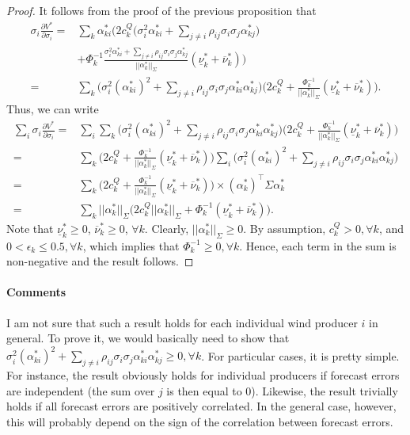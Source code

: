 \documentclass{article}
\begin{document}
\begin{proof}
It follows from the proof of the previous proposition that
\begin{align*}
\sigma_i \frac{\partial V^*}{\partial \sigma_i} =& \sum_k\alpha_{ki}^*\Big(2c_k^Q\big(\sigma_i^2 \alpha_{ki}^* + \sum_{j \ne i} \rho_{ij} \sigma_i \sigma_j\alpha_{kj}^*\big)\\
&+ \Phi_k^{-1} \frac{\sigma_i^2 \alpha_{ki}^* + \sum_{j \ne i} \rho_{ij} \sigma_i \sigma_j \alpha_{kj}^*}{||\alpha_k^*||_{\Sigma}}(\underline{\nu}_k^* + \overline{\nu}_k^*)\Big)\\
=&  \sum_k\Big(\sigma_i^2 (\alpha_{ki}^*)^2 + \sum_{j \ne i} \rho_{ij} \sigma_i \sigma_j\alpha_{ki}^* \alpha_{kj}^*\Big)\Big(2c_k^Q + \frac{\Phi_k^{-1}}{||\alpha_k^*||_{\Sigma}}(\underline{\nu}_k^* + \overline{\nu}_k^*)\Big).
\end{align*}
Thus, we can write
\begin{align*}
\sum_i \sigma_i \frac{\partial V^*}{\partial \sigma_i} =& \sum_i \sum_k \Big(\sigma_i^2 (\alpha_{ki}^*)^2 + \sum_{j \ne i} \rho_{ij} \sigma_i \sigma_j\alpha_{ki}^* \alpha_{kj}^*\Big) \Big(2c_k^Q + \frac{\Phi_k^{-1}}{||\alpha_k^*||_{\Sigma}}(\underline{\nu}_k^* + \overline{\nu}_k^*)\Big)\\
=& \sum_k \Big(2c_k^Q + \frac{\Phi_k^{-1}}{||\alpha_k^*||_{\Sigma}}(\underline{\nu}_k^* + \overline{\nu}_k^*)\Big) \sum_i \Big(\sigma_i^2 (\alpha_{ki}^*)^2 + \sum_{j \ne i} \rho_{ij} \sigma_i \sigma_j\alpha_{ki}^* \alpha_{kj}^*\Big)\\
=& \sum_k \Big(2c_k^Q + \frac{\Phi_k^{-1}}{||\alpha_k^*||_{\Sigma}}(\underline{\nu}_k^* + \overline{\nu}_k^*)\Big) \times(\alpha_k^*)^\top \Sigma \alpha_k^*\\
=& \sum_k ||\alpha_k^*||_{\Sigma} \Big(2c_k^Q ||\alpha_k^*||_{\Sigma} + \Phi_k^{-1} (\underline{\nu}_k^* + \overline{\nu}_k^*)\Big).
\end{align*}
Note that $\underline{\nu}_k^* \ge 0$, $\overline{\nu}_k^* \ge 0$, $\forall k$. Clearly, $||\alpha_k^*||_{\Sigma} \ge 0$. By assumption, $c_k^Q > 0, \forall k$, and $0 < \epsilon_k \le 0.5, \forall k$, which implies that $\Phi^{-1}_k \ge 0, \forall k$. Hence, each term in the sum is non-negative and the result follows.
\end{proof}

\paragraph{Comments} I am not sure that such a result holds for each individual wind producer $i$ in general. To prove it, we would basically need to show that $\sigma_i^2 (\alpha_{ki}^*)^2 + \sum_{j \ne i} \rho_{ij} \sigma_i \sigma_j \alpha_{ki}^* \alpha_{kj}^* \ge 0, \forall k$. For particular cases, it is pretty simple. For instance, the result obviously holds for individual producers if forecast errors are independent (the sum over $j$ is then equal to 0). Likewise, the result trivially holds if all forecast errors are positively correlated. In the general case, however, this will probably depend on the sign of the correlation between forecast errors.
\end{document}
